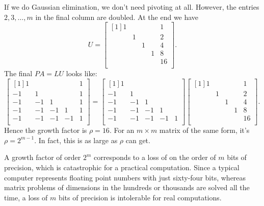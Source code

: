 If we do Gaussian elimination, we don't need pivoting at all. However, the entries $2,3,\ldots ,m$ in the final column are doubled. At the end we have 
\begin{equation}
\label{eq: U of bad eg}
U = \begin{bmatrix}[1] 
    1 &  &  &  &  1 \\
     & 1 &  &  &  2 \\
     &  & 1 &  &  4 \\
     &  &  & 1 &  8 \\
     &  &  &  &  16 \\
\end{bmatrix}.    
\end{equation}
The final $PA = LU$ looks like: 
\[
    \begin{bmatrix}[1] 
        1 &  &  &  &  1 \\
        -1 & 1 &  &  &  1 \\
        -1 & -1 & 1 &  &  1 \\
        -1 & -1 & -1 & 1 &  1 \\
        -1 & -1 & -1 & -1 &  1 \\
    \end{bmatrix}
    = 
    \begin{bmatrix}[1] 
        1 &  &  &  &   \\
        -1 & 1 &  &  &   \\
        -1 & -1 & 1 &  &   \\
        -1 & -1 & -1 & 1 &   \\
        -1 & -1 & -1 & -1 &  1 \\
    \end{bmatrix}
    \begin{bmatrix}[1] 
        1 &  &  &  &  1 \\
         & 1 &  &  &  2 \\
         &  & 1 &  &  4 \\
         &  &  & 1 &  8 \\
         &  &  &  &  16 \\
    \end{bmatrix} . 
\]
Hence the growth factor is $\rho=16$. For an $m\times m$ matrix of the same form, it's $\rho = 2^{m-1}$. In fact, this is as large as $\rho$ can get.  

A growth factor of order $2^m$ corresponds to a loss of on the order of $m$ bits of precision, which is catastrophic for a practical computation. Since a typical computer represents floating point numbers with just sixty-four bits, whereas matrix problems of dimensions in the hundreds or thousands are solved all the time, a loss of $m$ bits of precision is intolerable for real computations. 

